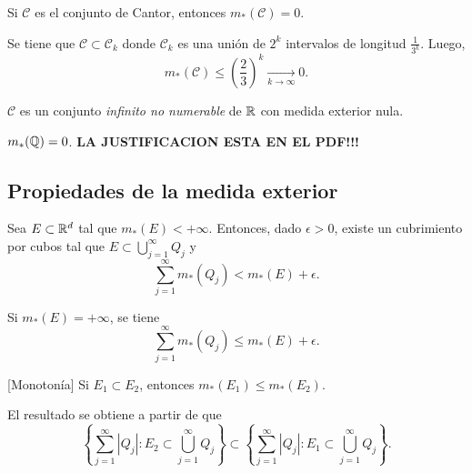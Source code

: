     \begin{ejemplo}{}
    Si $\mathscr{C}$ es el conjunto de Cantor, entonces $m_{*}(\mathscr{C})=0$.
    \begin{demo}
    Se tiene que $\mathscr{C}\subset \mathscr{C}_k$ donde $\mathscr{C}_k$ es una uni\'on de $2^k$ intervalos de longitud $\frac{1}{3^k}$. 
    Luego, 
    \[
    m_{*}(\mathscr{C})\leq \left(\frac{2}{3}\right)^k \xrightarrow[k \to \infty]{}0.
    \]
    \end{demo}
    $\mathscr{C}$ es un  conjunto \emph{infinito no numerable} de $\mathbb{R}$     con medida exterior nula.
    \end{ejemplo}
    
    \begin{ejemplo}{}
    $m_{*}(\mathbb{Q})=0$.
    \textbf{LA JUSTIFICACION ESTA EN EL PDF!!!}
    \end{ejemplo}
    
    \subsection{Propiedades de la medida exterior}
    
    \begin{observacion}{}
    Sea $E \subset \mathbb{R}^d$ tal que  $m_*(E)<+\infty$. 
    Entonces, dado $\epsilon>0$, existe un cubrimiento por cubos  tal que $E \subset \bigcup\limits_{j=1}^{\infty} Q_j$ y 
    \[
    \sum\limits_{j=1}^{\infty} m_{*}(Q_j)< m_{*}(E)+\epsilon.
    \]

    Si $m_{*}(E)=+\infty$, se tiene
    \[
    \sum\limits_{j=1}^{\infty} m_{*}(Q_j)\leq m_{*}(E)+\epsilon.
    \]
    \end{observacion}
        
    \begin{observacion}{}[Monoton\'ia]
    Si $E_1\subset E_2$, entonces $m_{*}(E_1)\leq m_{*}(E_2)$.
    
    El resultado se obtiene a partir de que 
    \[
   \left \{ \sum\limits_{j=1}^{\infty} |Q_j|: E_2\subset \bigcup\limits_{j=1}^{\infty} Q_j
    \right\}
    \subset
     \left\{ \sum\limits_{j=1}^{\infty} |Q_j|: E_1\subset \bigcup\limits_{j=1}^{\infty} Q_j
    \right\}.
    \]
    \end{observacion}
    

